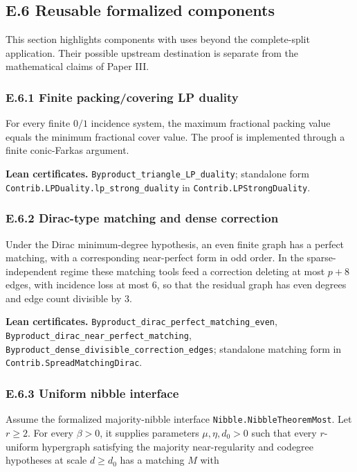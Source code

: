 \documentclass[
  american,
  11pt,
  a4paper,
]{article}
\begin{document}
\subsection{E.6 Reusable formalized components}\label{e.6-reusable-formalized-components}

This section highlights components with uses beyond the complete-split application. Their possible upstream destination is separate from the mathematical claims of Paper III.

\subsubsection{E.6.1 Finite packing/covering LP duality}\label{e.6.1-finite-packingcovering-lp-duality}

For every finite \(0/1\) incidence system, the maximum fractional packing value equals the minimum fractional cover value. The proof is implemented through a finite conic-Farkas argument.

\textbf{Lean certificates.} \texttt{Byproduct\_triangle\_LP\_duality}; standalone form \texttt{Contrib.LPDuality.lp\_strong\_duality} in \texttt{Contrib.LPStrongDuality}.

\subsubsection{E.6.2 Dirac-type matching and dense correction}\label{e.6.2-dirac-type-matching-and-dense-correction}

Under the Dirac minimum-degree hypothesis, an even finite graph has a perfect matching, with a corresponding near-perfect form in odd order. In the sparse-independent regime these matching tools feed a correction deleting at most \(p+8\) edges, with incidence loss at most \(6\), so that the residual graph has even degrees and edge count divisible by \(3\).

\textbf{Lean certificates.} \texttt{Byproduct\_dirac\_perfect\_matching\_even}, \texttt{Byproduct\_dirac\_near\_perfect\_matching}, \texttt{Byproduct\_dense\_divisible\_correction\_edges}; standalone matching form in \texttt{Contrib.SpreadMatchingDirac}.

\subsubsection{E.6.3 Uniform nibble interface}\label{e.6.3-uniform-nibble-interface}

Assume the formalized majority-nibble interface \texttt{Nibble.NibbleTheoremMost}. Let \(r\ge2\). For every \(\beta>0\), it supplies parameters \(\mu,\eta,d_0>0\) such that every \(r\)-uniform hypergraph satisfying the majority near-regularity and codegree hypotheses at scale \(d\ge d_0\) has a matching \(M\) with
\end{document}
